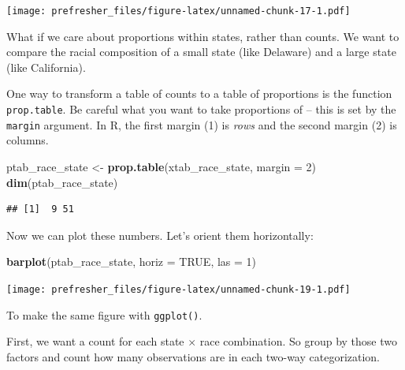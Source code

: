 \documentclass[]{book}
\newenvironment{Shaded}{\begin{snugshade}}{\end{snugshade}}
\newcommand{\KeywordTok}[1]{\textcolor[rgb]{0.13,0.29,0.53}{\textbf{#1}}}
\newcommand{\DataTypeTok}[1]{\textcolor[rgb]{0.13,0.29,0.53}{#1}}
\newcommand{\DecValTok}[1]{\textcolor[rgb]{0.00,0.00,0.81}{#1}}
\newcommand{\StringTok}[1]{\textcolor[rgb]{0.31,0.60,0.02}{#1}}
\newcommand{\OtherTok}[1]{\textcolor[rgb]{0.56,0.35,0.01}{#1}}
\newcommand{\OperatorTok}[1]{\textcolor[rgb]{0.81,0.36,0.00}{\textbf{#1}}}
\newcommand{\NormalTok}[1]{#1}
\theoremstyle{definition}
\theoremstyle{definition}
\theoremstyle{definition}
\theoremstyle{remark}
\begin{document}
\texttt{[image: prefresher\_files/figure-latex/unnamed-chunk-17-1.pdf]}

What if we care about proportions within states, rather than counts. We
want to compare the racial composition of a small state (like Delaware)
and a large state (like California).

One way to transform a table of counts to a table of proportions is the
function \texttt{prop.table}. Be careful what you want to take
proportions of -- this is set by the \texttt{margin} argument. In R, the
first margin (1) is \emph{rows} and the second margin (2) is columns.

\begin{Shaded}
\begin{Highlighting}[]
\NormalTok{ptab_race_state <-}\StringTok{ }\KeywordTok{prop.table}\NormalTok{(xtab_race_state, }\DataTypeTok{margin =} \DecValTok{2}\NormalTok{)}
\KeywordTok{dim}\NormalTok{(ptab_race_state)}
\end{Highlighting}
\end{Shaded}

\begin{verbatim}
## [1]  9 51
\end{verbatim}

Now we can plot these numbers. Let's orient them horizontally:

\begin{Shaded}
\begin{Highlighting}[]
\KeywordTok{barplot}\NormalTok{(ptab_race_state, }\DataTypeTok{horiz =} \OtherTok{TRUE}\NormalTok{, }\DataTypeTok{las =} \DecValTok{1}\NormalTok{)}
\end{Highlighting}
\end{Shaded}

\texttt{[image: prefresher\_files/figure-latex/unnamed-chunk-19-1.pdf]}

To make the same figure with \texttt{ggplot()}.

First, we want a count for each state \(\times\) race combination. So
group by those two factors and count how many observations are in each
two-way categorization.

\begin{Shaded}
\end{Shaded}
\end{document}
